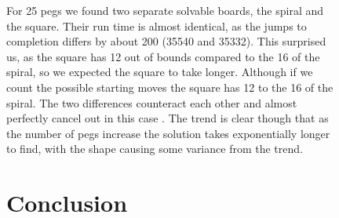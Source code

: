 \documentclass[11pt]{article}
\begin{document}
\newpage
\begin{figure}
For 25 pegs we found two separate solvable boards, the spiral and the square. Their run time is almost identical, as the jumps to completion differs by about 200 (35540 and 35332). This surprised us, as the square has 12 out of bounds compared to the 16 of the spiral, so we expected the square to take longer. Although if we count the possible starting moves the square has 12 to the 16 of the spiral. The two differences counteract each other and almost perfectly cancel out in this case
\newline.
The trend is clear though that as the number of pegs increase the solution takes exponentially longer to find, with the shape causing some variance from the trend.

\section{Conclusion}

\end{figure}

\newpage
\begin{figure}



\end{figure}
\end{document}
